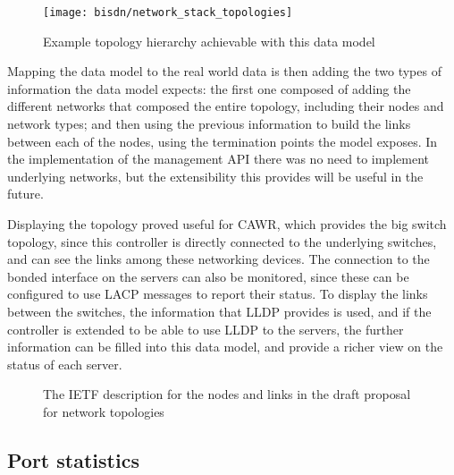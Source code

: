 \begin{figure} [!htbp]
    \centering
    \texttt{[image: bisdn/network\_stack\_topologies]}
    \caption{Example topology hierarchy achievable with this data model \cite {CITE - https://www.ietf.org/id/draft-ietf-i2rs-yang-network-topo-20.txt}}
\end{figure}

\par Mapping the data model to the real world data is then adding the two types of information the data model expects: the first one composed of adding the different networks that composed the entire topology, including their
nodes and network types; and then using the previous information to build the links between each of the nodes, using the termination points the model exposes. In the implementation of the management API there was no need to implement 
underlying networks, but the extensibility this provides will be useful in the future.
\par Displaying the topology proved useful for CAWR, which provides the big switch topology, since this controller is directly connected to the underlying switches, and can see the links among these networking devices. The connection
to the bonded interface on the servers can also be monitored, since these can be configured to use LACP messages to report their status. To display the links between the switches, the information that LLDP provides is used, 
and if the controller is extended to be able to use LLDP to the servers, the further information can be filled into this data model, and provide a richer view on the status of each server.

\begin{figure} [h]
    \begin{subfigure}
    \texttt{[image: bisdn/ietf\_link]}
    \end{subfigure}
    \begin{subfigure}
    \texttt{[image: bisdn/ietf\_node]}
    \end{subfigure}
\caption{The IETF description for the nodes and links in the draft proposal for network topologies \cite {CITE - https://www.ietf.org/id/draft-ietf-i2rs-yang-network-topo-20.txt} }
\end{figure}

\subsection {Port statistics}

